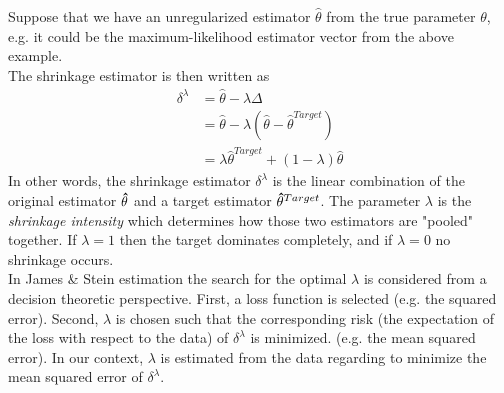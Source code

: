 \begin{definition}
Suppose that we have an unregularized estimator $\hat \theta$ from the true parameter $\theta$, e.g. it could be the maximum-likelihood estimator vector from the 	above example.
\\
The shrinkage estimator is then written as
\begin{align}
	\delta^{\lambda} 	& = \hat \theta - \lambda \Delta \nonumber \\
						& = \hat \theta - \lambda(\hat \theta - {\hat \theta}^{Target}) \nonumber \\
						& = \lambda{\hat \theta}^{Target} + (1-\lambda){\hat \theta} \label{eq:srule}
\end{align}
In other words, the shrinkage estimator $\delta^{\lambda}$ is the linear combination of the original estimator ${\bf \hat \theta}$ and a target estimator ${\bf \hat \theta}^{Target}$. The parameter $\lambda$ is the {\it shrinkage intensity} which determines how those two estimators are "pooled" together. If $\lambda = 1$ then the target dominates completely, and if $\lambda = 0$ no shrinkage occurs.\\
In James \& Stein estimation the search for the optimal $\lambda$ is considered from a decision theoretic perspective. First, a loss function is selected (e.g. the squared error). Second, $\lambda$ is chosen such that the corresponding risk (the expectation of the loss with respect to the data) of $\delta^{\lambda}$ is minimized. (e.g. the mean squared error). In our context, $\lambda$ is estimated from the data regarding to minimize the mean squared error of $\delta^{\lambda}$.\\
\end{definition}
